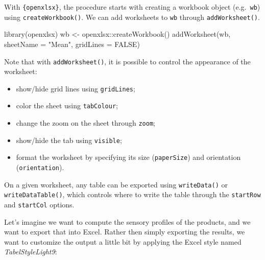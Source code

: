 \documentclass[
]{krantz}
\makeatletter
\newenvironment{Shaded}{\begin{snugshade}}{\end{snugshade}}
\newcommand{\AttributeTok}[1]{\textcolor[rgb]{0.61,0.61,0.61}{#1}}
\newcommand{\ConstantTok}[1]{\textcolor[rgb]{0,0,0}{#1}}
\newcommand{\FunctionTok}[1]{\textcolor[rgb]{0,0,0}{#1}}
\newcommand{\NormalTok}[1]{#1}
\newcommand{\OtherTok}[1]{\textcolor[rgb]{0.37,0.37,0.37}{#1}}
\newcommand{\SpecialCharTok}[1]{\textcolor[rgb]{0,0,0}{#1}}
\newcommand{\StringTok}[1]{\textcolor[rgb]{0.5,0.5,0.5}{#1}}
\providecommand{\tightlist}{%
  \setlength{\itemsep}{0pt}\setlength{\parskip}{0pt}}
\newenvironment{kframe}{%
\medskip{}
\setlength{\fboxsep}{.8em}
 \def\at@end@of@kframe{}%
 \ifinner\ifhmode%
  \def\at@end@of@kframe{\end{minipage}}%
  \begin{minipage}{\columnwidth}%
 \fi\fi%
 \def\FrameCommand##1{\hskip\@totalleftmargin \hskip-\fboxsep
 \colorbox{shadecolor}{##1}\hskip-\fboxsep
     \hskip-\linewidth \hskip-\@totalleftmargin \hskip\columnwidth}%
 \MakeFramed {\advance\hsize-\width
   \@totalleftmargin\z@ \linewidth\hsize
   \@setminipage}}%
 {\par\unskip\endMakeFramed%
 \at@end@of@kframe}
\renewenvironment{Shaded}{\begin{kframe}}{\end{kframe}}
\makeatother
\begin{document}
With \texttt{\{openxlsx\}}, the procedure starts with creating a workbook object (e.g.~\texttt{wb}) using \texttt{createWorkbook()}. We can add worksheets to \texttt{wb} through \texttt{addWorksheet()}.

\begin{Shaded}
\begin{Highlighting}[]
\FunctionTok{library}\NormalTok{(openxlsx)}
\NormalTok{wb }\OtherTok{\textless{}{-}}\NormalTok{ openxlsx}\SpecialCharTok{::}\FunctionTok{createWorkbook}\NormalTok{()}
\FunctionTok{addWorksheet}\NormalTok{(wb, }\AttributeTok{sheetName =} \StringTok{"Mean"}\NormalTok{, }\AttributeTok{gridLines =} \ConstantTok{FALSE}\NormalTok{)}
\end{Highlighting}
\end{Shaded}

Note that with \texttt{addWorksheet()}, it is possible to control the appearance of the worksheet:

\begin{itemize}
\tightlist
\item
  show/hide grid lines using \texttt{gridLines};
\item
  color the sheet using \texttt{tabColour};
\item
  change the zoom on the sheet through \texttt{zoom};
\item
  show/hide the tab using \texttt{visible};
\item
  format the worksheet by specifying its size (\texttt{paperSize}) and orientation (\texttt{orientation}).
\end{itemize}

On a given worksheet, any table can be exported using \texttt{writeData()} or \texttt{writeDataTable()}, which controls where to write the table through the \texttt{startRow} and \texttt{startCol} options.

Let's imagine we want to compute the sensory profiles of the products, and we want to export that into Excel. Rather then simply exporting the results, we want to customize the output a little bit by applying the Excel style named \emph{TabelStyleLight9}:
\end{document}
